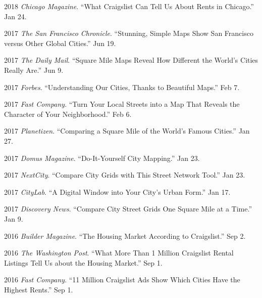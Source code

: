 \documentclass{academiccv}
\begin{document}
\begin{tablist}
	
\item 2018 \tab \textit{Chicago Magazine}. \enquote{What Craigslist Can Tell Us About Rents in Chicago.} Jan 24.
	
\item 2017 \tab \textit{The San Francisco Chronicle}. \enquote{Stunning, Simple Maps Show San Francisco versus Other Global Cities.} Jun 19.

\item 2017 \tab \textit{The Daily Mail}. \enquote{Square Mile Maps Reveal How Different the World's Cities Really Are.} Jun 9.

\item 2017 \tab \textit{Forbes}. \enquote{Understanding Our Cities, Thanks to Beautiful Maps.} Feb 7.

\item 2017 \tab \textit{Fast Company}. \enquote{Turn Your Local Streets into a Map That Reveals the Character of Your Neighborhood.} Feb 6.

\item 2017 \tab \textit{Planetizen}. \enquote{Comparing a Square Mile of the World's Famous Cities.} Jan 27.

\item 2017 \tab \textit{Domus Magazine}. \enquote{Do-It-Yourself City Mapping.} Jan 23.

\item 2017 \tab \textit{NextCity}. \enquote{Compare City Grids with This Street Network Tool.} Jan 23.

\item 2017 \tab \textit{CityLab}. \enquote{A Digital Window into Your City's Urban Form.} Jan 17.

\item 2017 \tab \textit{Discovery News}. \enquote{Compare City Street Grids One Square Mile at a Time.} Jan 9.

\item 2016 \tab \textit{Builder Magazine}. \enquote{The Housing Market According to Craigslist.} Sep 2.

\item 2016 \tab \textit{The Washington Post}. \enquote{What More Than 1 Million Craigslist Rental Listings Tell Us about the Housing Market.} Sep 1.

\item 2016 \tab \textit{Fast Company}. \enquote{11 Million Craigslist Ads Show Which Cities Have the Highest Rents.} Sep 1.


\end{tablist}
\end{document}
